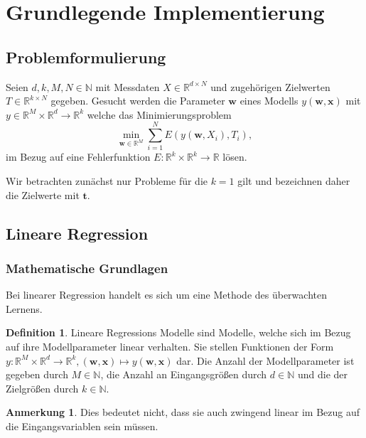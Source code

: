\documentclass{article}
\theoremstyle{plain} %
\theoremstyle{definition} %
\newtheorem{definition}[theorem]{Definition}
\newtheorem{anno}[theorem]{Anmerkung}
\begin{document}
\section{Grundlegende Implementierung}
\subsection{Problemformulierung}
Seien $d,k,M,N \in \mathbb{N}$ mit Messdaten $X \in \mathbb{R}^{d \times N}$ und zugehörigen Zielwerten $T \in \mathbb{R}^{k \times N}$ gegeben. Gesucht werden die Parameter $\mathbf{w}$ eines Modells $y(\mathbf{w}, \mathbf{x})$ mit $y \in \mathbb{R}^M \times \mathbb{R}^d \rightarrow \mathbb{R}^{k}$ welche das Minimierungsproblem
$$
    \min_{\mathbf{w} \in \mathbb{R}^M}\sum_{i=1}^N E(y(\mathbf{w}, X_{i}), T_{i}),
$$
im Bezug auf eine Fehlerfunktion $E: \mathbb{R}^k \times \mathbb{R}^k \rightarrow \mathbb{R}$ lösen.

Wir betrachten zunächst nur Probleme für die $k=1$ gilt und bezeichnen daher die Zielwerte mit $\mathbf{t}$.

\subsection{Lineare Regression}
\subsubsection{Mathematische Grundlagen}
Bei linearer Regression handelt es sich um eine Methode des überwachten Lernens.
\begin{definition}
  Lineare Regressions Modelle sind Modelle, welche sich im Bezug auf ihre Modellparameter linear verhalten\cite[S. 137f]{Bishop}. Sie stellen Funktionen der Form $y: \mathbb{R}^M \times \mathbb{R}^d \rightarrow \mathbb{R}^k, (\mathbf{w}, \mathbf{x}) \mapsto y(\mathbf{w}, \mathbf{x})$ dar. Die Anzahl der Modellparameter ist gegeben durch $M \in \mathbb{N}$, die Anzahl an Eingangsgrößen durch $d \in \mathbb{N}$ und die der Zielgrößen durch $k \in \mathbb{N}$.
\end{definition}
\begin{anno}
  Dies bedeutet nicht, dass sie auch zwingend linear im Bezug auf die Eingangsvariablen sein müssen.
\end{anno}
\end{document}
